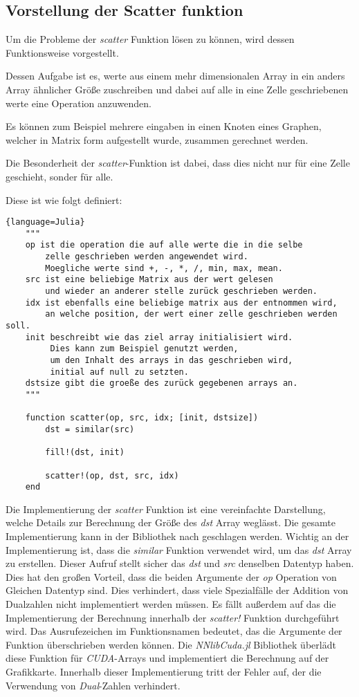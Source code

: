\subsection{Vorstellung der Scatter funktion}

Um die Probleme der \textit{scatter} Funktion lösen zu können, 
wird dessen Funktionsweise vorgestellt.

Dessen Aufgabe ist es, werte aus einem mehr dimensionalen Array 
in ein anders Array ähnlicher Größe zuschreiben 
und dabei auf alle in eine Zelle geschriebenen werte eine Operation anzuwenden.


Es können zum Beispiel mehrere eingaben in einen Knoten eines Graphen, 
welcher in Matrix form aufgestellt wurde,
zusammen gerechnet werden.

Die Besonderheit der \textit{scatter}-Funktion ist dabei, 
dass dies nicht nur für eine Zelle geschieht, sonder für alle.

Diese ist wie folgt definiert:

\begin{lstlisting}{language=Julia}
	"""
	op ist die operation die auf alle werte die in die selbe 
	    zelle geschrieben werden angewendet wird.
		Moegliche werte sind +, -, *, /, min, max, mean.
	src ist eine beliebige Matrix aus der wert gelesen 
	    und wieder an anderer stelle zurück geschrieben werden.
	idx ist ebenfalls eine beliebige matrix aus der entnommen wird,
	    an welche position, der wert einer zelle geschrieben werden soll.
	init beschreibt wie das ziel array initialisiert wird.
	     Dies kann zum Beispiel genutzt werden, 
		 um den Inhalt des arrays in das geschrieben wird, 
		 initial auf null zu setzten.
	dstsize gibt die groeße des zurück gegebenen arrays an.
	"""

	function scatter(op, src, idx; [init, dstsize])
		dst = similar(src)
		
		fill!(dst, init)
		
		scatter!(op, dst, src, idx)
	end
\end{lstlisting}

Die Implementierung der \textit{scatter} Funktion ist eine vereinfachte Darstellung, 
welche Details zur Berechnung der Größe des \textit{dst} Array weglässt.
Die gesamte Implementierung kann in der  Bibliothek \cite{} nach geschlagen werden.
Wichtig an der Implementierung ist, dass die \textit{similar} Funktion verwendet wird, um das
\textit{dst} Array zu erstellen.
Dieser Aufruf stellt sicher das \textit{dst} und \textit{src} denselben Datentyp haben.
Dies hat den großen Vorteil, 
dass die beiden Argumente der \textit{op} Operation von Gleichen Datentyp sind.
Dies verhindert, 
dass viele Spezialfälle der Addition von Dualzahlen nicht implementiert werden müssen.
Es fällt außerdem auf das die Implementierung der Berechnung innerhalb der \textit{scatter!} Funktion
durchgeführt wird.
Das Ausrufezeichen im Funktionsnamen bedeutet, das die Argumente der Funktion überschrieben werden können.
Die \textit{NNlibCuda.jl} Bibliothek überlädt diese Funktion für \textit{CUDA}-Arrays und
implementiert die Berechnung auf der Grafikkarte.
Innerhalb dieser Implementierung tritt der Fehler auf, der die Verwendung von \textit{Dual}-Zahlen
verhindert.